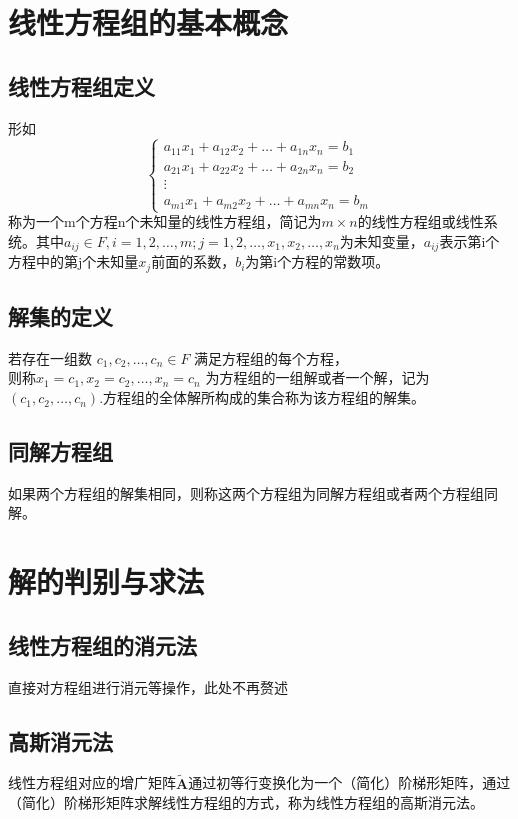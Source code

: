 \documentclass[UTF-8,a4paper]{ctexart}
\begin{document}
\section{线性方程组的基本概念}
\subsection{线性方程组定义}
形如
\[\begin{cases}
    a_{11}x_1 + a_{12}x_2 + \dots + a_{1n}x_n = b_1\\
    a_{21}x_1 + a_{22}x_2 + \dots + a_{2n}x_n = b_2\\
    \vdots \\
    a_{m1}x_1 + a_{m2}x_2 + \dots + a_{mn}x_n = b_m
\end{cases}
\]
称为一个m个方程n个未知量的线性方程组，简记为\(m \times n\)的线性方程组或线性系统。其中\(a_{ij} \in F, i=1,2,\dots ,m; j=1,2,\dots,  x_1 , x_2 , \dots , x_n\)为未知变量，\(a_{ij}\)表示第i个方程中的第j个未知量\(x_j\)前面的系数，\(b_i\)为第i个方程的常数项。

\subsection{解集的定义}
若存在一组数 \(c_1,c_2,\dots ,c_n \in F\) 满足方程组的每个方程，\\则称\(x_1=c_1,x_2=c_2,\dots ,x_n=c_n\) 为方程组的一组解或者一个解，记为\((c_1,c_2,\dots ,c_n)\).方程组的全体解所构成的集合称为该方程组的解集。

\subsection{同解方程组}
如果两个方程组的解集相同，则称这两个方程组为同解方程组或者两个方程组同解。

\section{解的判别与求法}
\subsection{线性方程组的消元法} 直接对方程组进行消元等操作，此处不再赘述
\subsection{高斯消元法} 线性方程组对应的增广矩阵\(\mathbf {\tilde A}\)通过初等行变换化为一个（简化）阶梯形矩阵，通过（简化）阶梯形矩阵求解线性方程组的方式，称为线性方程组的高斯消元法。
\end{document}
